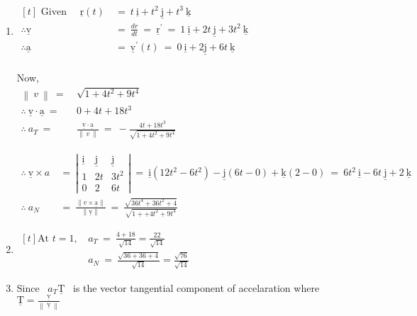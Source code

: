 \documentclass[12pt]{article}
\renewcommand{\vec}[1]{\underline{\mathrm{#1}}}
\newcommand{\norm}[1]{\left\lVert\ #1\ \right\rVert}
\begin{document}
\begin{enumerate}[label=\textbf{\mred{(\alph*)}}]
\item 
\vspace{1ex}
$\begin{aligned}[t]
\text{ Given } \quad \vec{r}(t) \ &= \ t\ \vec{i} + t^2 \ \vec{j} + t^3 \ \vec{k}\\
\therefore \vec{v} \ &= \ \frac{d r}{d t} \ = \ \vec{r}^{\prime} \ = \ 1 \ \vec{i}+2 t \ \vec{j}+3 t^2\ \vec{k} \\
\therefore\vec{a} \ &= \ \vec{v}^{\prime}(t) \ = \ 0\ \vec{i}+2 \vec{j} + 6t \ \vec{k} \\
\end{aligned}$

\vspace{3ex}
Now,\\
$\begin{aligned}
  \norm{v} \ = \ & \sqrt{1+4 t^2+9 t^4} \\
   \therefore \ \vec{v} \cdot \vec{a} \ = \ & 0+4 t+18 t^3 \\
   \therefore \ a_T
   \ = \ & \frac{\vec{v} \cdot\vec{a}}{\norm{v}}
   \ = \ -\frac{4 t+18 t^3}{\sqrt{1+4 t^2+9 t^4}}
\end{aligned}$

\vspace{3ex}
$\begin{aligned}
\therefore \ \vec{v} \times a \ &= \ \left|\begin{array}{ccc}
\vec{i} & \vec{j} & \vec{j} \\
1 & 2 t & 3 t^2 \\
0 & 2 & 6 t
\end{array}\right| \ = \ \vec{i} \left(12 t^2-6 t^2\right) - \vec{j}(6 t-0) + \vec{k}(2-0) \ = \ 6 t^2 \ \vec{i}-6 t \ \vec{j} + 2 \ \vec{k}\\[1ex]
\therefore \ a_N \ &= \ \frac{\|v \times\vec{a}\|}{\|\vec{v}\|}
\ = \ \frac{\sqrt{36 t^4+36 t^2+4}}{\sqrt{1++4 t^2+9 t^4}}
\end{aligned}$


\vspace{4ex}
\item
$\begin{aligned}[t]
\text{At $t=1$, \ }& a_T \ = \ \frac{4+18}{\sqrt{14}} = \frac{22}{\sqrt{14}} \\[0.5ex]
& a_N \ = \ \frac{\sqrt{36+36+4}}{\sqrt{14}}= \frac{\sqrt{76}}{\sqrt{14}}
\end{aligned}$

\pagebreak
\item
Since \ $a_T \vec{T}$ \ is the vector tangential component of accelaration where \ $\vec{T}= \frac{\vec{v}}{\norm{\vec{v}}}$


\end{enumerate}
\end{document}
